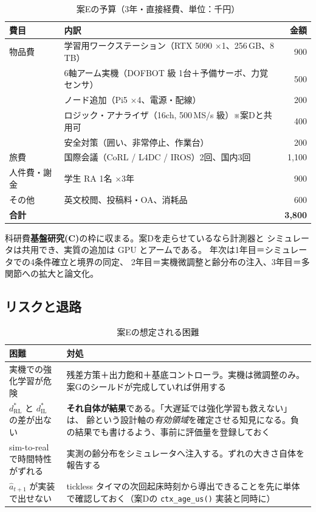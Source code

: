 \documentclass[11pt,a4paper]{article}
\newcommand{\code}[1]{\texttt{#1}}
\newcommand{\prob}[1]{\textbf{\textcolor{red!55!black}{#1}}}
\newcommand{\keyp}[1]{\textbf{\textcolor{blue!45!black}{#1}}}
\begin{document}
\begin{table}[htbp]
\centering
\small
\caption{案Eの予算（3年・直接経費、単位：千円）}
\begin{tabularx}{\textwidth}{@{}l X r@{}}
\toprule
\textbf{費目} & \textbf{内訳} & \textbf{金額} \\
\midrule
物品費 & 学習用ワークステーション（RTX 5090 ×1、256\,GB、8\,TB） & 900 \\
       & 6軸アーム実機（DOFBOT 級 1台＋予備サーボ、力覚センサ） & 500 \\
       & ノード追加（Pi5 ×4、電源・配線） & 200 \\
       & ロジック・アナライザ（16ch, 500\,MS/s 級）※案Dと共用可 & 400 \\
       & 安全対策（囲い、非常停止、作業台） & 200 \\
\midrule
旅費 & 国際会議（CoRL / L4DC / IROS）2回、国内3回 & 1,100 \\
\midrule
人件費・謝金 & 学生 RA 1名 ×3年 & 900 \\
\midrule
その他 & 英文校閲、投稿料・OA、消耗品 & 600 \\
\midrule
\textbf{合計} & & \textbf{3,800} \\
\bottomrule
\end{tabularx}
\end{table}

\noindent
科研費\keyp{基盤研究(C)}の枠に収まる。案Dを走らせているなら計測器と
シミュレータは共用でき、実質の追加は GPU とアームである。
年次は1年目＝シミュレータでの4条件確立と境界の同定、
2年目＝実機微調整と齢分布の注入、3年目＝多関節への拡大と論文化。

\subsection{リスクと退路}

\begin{table}[htbp]
\centering
\small
\caption{案Eの想定される困難}
\begin{tabularx}{\textwidth}{@{}X X@{}}
\toprule
\textbf{困難} & \textbf{対処} \\
\midrule
実機での強化学習が危険 & 残差方策＋出力飽和＋基底コントローラ。実機は微調整のみ。案Gのシールドが完成していれば併用する \\
$d^{*}_{\mathrm{RL}}$ と $d^{*}_{\mathrm{IL}}$ の差が出ない & \prob{それ自体が結果}である。「大遅延では強化学習も救えない」は、
  齢という設計軸の\emph{有効領域}を確定させる知見になる。負の結果でも書けるよう、事前に評価量を登録しておく \\
sim-to-real で時間特性がずれる & 実測の齢分布をシミュレータへ注入する。ずれの大きさ自体を報告する \\
$\hat a_{t+1}$ が実装で出せない & tickless タイマの次回起床時刻から導出できることを先に単体で確認しておく（案Dの \code{ctx\_age\_us()} 実装と同時に） \\
\bottomrule
\end{tabularx}
\end{table}
\end{document}
